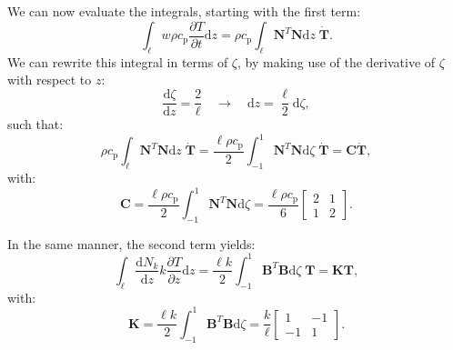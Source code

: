 \documentclass[10pt, a4paper, twoside, headinclude,footinclude, BCOR5mm]{scrartcl}
\begin{document}
We can now evaluate the integrals, starting with the first term:
\begin{equation*}
  \int_\ell w \rho c_\text{p}\frac{\partial T}{\partial t} \text{d}z =
  \rho c_\text{p}\int_\ell \mathbf{N}^T \mathbf{N} \text{d}z \; \mathbf{\dot{T}}.
\end{equation*}
We can rewrite this integral in terms of \(\zeta\), by making use of the derivative of \(\zeta\) with respect to \(z\):
\begin{equation*}
  \frac{\text{d}\zeta}{\text{d}z} = \frac{2}{\ell} \quad\rightarrow\quad
  \text{d}z = \frac{\ell}{2}\text{d}\zeta,
\end{equation*}
such that:
\begin{equation}
\label{eq:C}
  \rho c_\text{p} \int_\ell \mathbf{N}^T \mathbf{N}\text{d}z \;\mathbf{\dot{T}} =
  \frac{\ell\rho c_\text{p}}{2}\int_{-1}^{1} \mathbf{N}^T \mathbf{N} \text{d}\zeta \; \mathbf{\dot{T}} =
  \mathbf{C}\mathbf{\dot{T}},
\end{equation}
with:
\begin{equation*}
  \mathbf{C} = \frac{\ell\rho c_\text{p}}{2}\int_{-1}^{1} \mathbf{N}^T\mathbf{N} \text{d}\zeta =
  \frac{\ell\rho c_\text{p}}{6}\left[\begin{matrix} 2 & 1\\
                                               1 & 2\end{matrix}\right].
\end{equation*}

In the same manner, the second term yields:
\begin{equation}
  \int_\ell \frac{\text{d}N_k}{\text{d}z}k\frac{\partial T}{\partial z}\text{d}z =
  \frac{\ell k}{2} \int_{-1}^{1} \mathbf{B}^T \mathbf{B} \text{d}\zeta \;\mathbf{T} = \mathbf{K} \mathbf{T},
  \label{eq:K}
\end{equation}
with:
\begin{equation*}
  \mathbf{K} = \frac{\ell k}{2} \int_{-1}^{1} \mathbf{B}^T \mathbf{B} \text{d}\zeta =
  \frac{k}{\ell}\left[\begin{matrix} 1 & -1\\
                                              -1 & 1\end{matrix}\right].
\end{equation*}
\end{document}
